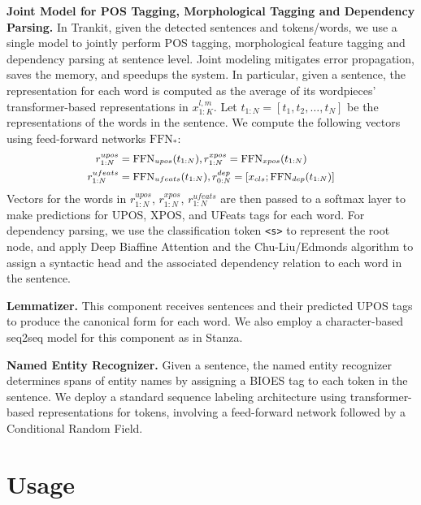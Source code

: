 \documentclass[11pt,a4paper]{article}
\begin{document}
\noindent \textbf{Joint Model for POS Tagging, Morphological Tagging and Dependency Parsing.} In Trankit, given the detected sentences and tokens/words, we use a single model to jointly perform POS tagging, morphological feature tagging and dependency parsing at sentence level. Joint modeling mitigates error propagation, saves the memory, and speedups the system. In particular, given a sentence, the representation for each word is computed as the average of its wordpieces' transformer-based representations in $x^{l,m}_{1:K}$. Let $t_{1:N}=[t_1, t_2, \ldots, t_N]$ be the representations of the words in the sentence. We compute the following vectors using feed-forward networks $\textrm{FFN}_*$:
\begin{equation*}
\small 
    \begin{split}
        r^{upos}_{1:N} &= \textrm{FFN}_{upos}(t_{1:N}), r^{xpos}_{1:N} = \textrm{FFN}_{xpos}(t_{1:N})\\
        r^{ufeats}_{1:N} &= \textrm{FFN}_{ufeats}(t_{1:N}), r^{dep}_{0:N} = [x_{cls}; \textrm{FFN}_{dep}(t_{1:N})]
    \end{split}
\end{equation*}
Vectors for the words in $r^{upos}_{1:N}$, $r^{xpos}_{1:N}$, $r^{ufeats}_{1:N}$ are then passed to a softmax layer to make predictions for UPOS, XPOS, and UFeats tags for each word. For dependency parsing, we use the classification token \texttt{<s>} to represent the root node, and apply Deep Biaffine Attention \citep{dozat2016deep} and the Chu-Liu/Edmonds algorithm \citep{chu1965shortest,edmonds1967optimum} to assign a syntactic head and the associated dependency relation to each word in the sentence.

\vspace{0.3cm}

\noindent \textbf{Lemmatizer.} This component receives sentences and their predicted UPOS tags to produce the canonical form for each word. We also employ a character-based seq2seq model for this component as in Stanza.

\vspace{0.3cm}

\noindent \textbf{Named Entity Recognizer.} Given a sentence, the named entity recognizer determines spans of entity names by assigning a BIOES tag to each token in the sentence. We deploy a standard sequence labeling architecture using transformer-based representations for tokens, involving a feed-forward network followed by a Conditional Random Field.

\section{Usage}
\end{document}
